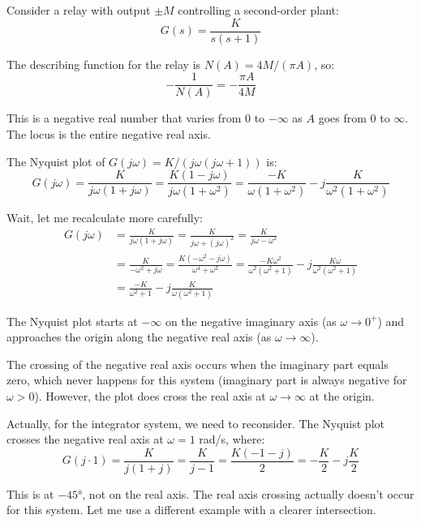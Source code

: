 \begin{example}
\label{ex:relay_limit_cycle}
Consider a relay with output $\pm M$ controlling a second-order plant:
\begin{equation}
G(s) = \frac{K}{s(s+1)}
\end{equation}

The describing function for the relay is $N(A) = 4M/(\pi A)$, so:
\begin{equation}
-\frac{1}{N(A)} = -\frac{\pi A}{4M}
\end{equation}

This is a negative real number that varies from $0$ to $-\infty$ as $A$ goes from $0$ to $\infty$. The locus is the entire negative real axis.

The Nyquist plot of $G(j\omega) = K/(j\omega(j\omega+1))$ is:
\begin{equation}
G(j\omega) = \frac{K}{j\omega(1 + j\omega)} = \frac{K(1 - j\omega)}{j\omega(1 + \omega^2)} = \frac{-K}{\omega(1+\omega^2)} - j\frac{K}{\omega^2(1+\omega^2)}
\end{equation}

Wait, let me recalculate more carefully:
\begin{align}
G(j\omega) &= \frac{K}{j\omega(1 + j\omega)} = \frac{K}{j\omega + (j\omega)^2} = \frac{K}{j\omega - \omega^2} \\
&= \frac{K}{-\omega^2 + j\omega} = \frac{K(-\omega^2 - j\omega)}{\omega^4 + \omega^2} = \frac{-K\omega^2}{\omega^2(\omega^2+1)} - j\frac{K\omega}{\omega^2(\omega^2+1)} \\
&= \frac{-K}{\omega^2+1} - j\frac{K}{\omega(\omega^2+1)}
\end{align}

The Nyquist plot starts at $-\infty$ on the negative imaginary axis (as $\omega \to 0^+$) and approaches the origin along the negative real axis (as $\omega \to \infty$).

The crossing of the negative real axis occurs when the imaginary part equals zero, which never happens for this system (imaginary part is always negative for $\omega > 0$). However, the plot does cross the real axis at $\omega \to \infty$ at the origin.

Actually, for the integrator system, we need to reconsider. The Nyquist plot crosses the negative real axis at $\omega = 1$ rad/s, where:
\begin{equation}
G(j\cdot 1) = \frac{K}{j(1+j)} = \frac{K}{j - 1} = \frac{K(-1-j)}{2} = -\frac{K}{2} - j\frac{K}{2}
\end{equation}

This is at $-45°$, not on the real axis. The real axis crossing actually doesn't occur for this system. Let me use a different example with a clearer intersection.
\end{example}

